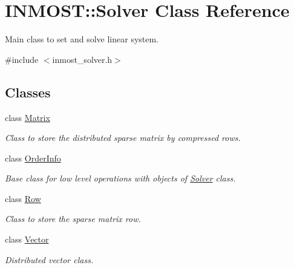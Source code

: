 \hypertarget{classINMOST_1_1Solver}{\section{I\-N\-M\-O\-S\-T\-:\-:Solver Class Reference}
\label{classINMOST_1_1Solver}
}


Main class to set and solve linear system.  




{\ttfamily \#include $<$inmost\-\_\-solver.\-h$>$}

\subsection*{Classes}
\begin{DoxyCompactItemize}
\item 
class \hyperlink{classINMOST_1_1Solver_1_1Matrix}{Matrix}
\begin{DoxyCompactList}\small\item\em Class to store the distributed sparse matrix by compressed rows. \end{DoxyCompactList}\item 
class \hyperlink{classINMOST_1_1Solver_1_1OrderInfo}{Order\-Info}
\begin{DoxyCompactList}\small\item\em Base class for low level operations with objects of \hyperlink{classINMOST_1_1Solver}{Solver} class. \end{DoxyCompactList}\item 
class \hyperlink{classINMOST_1_1Solver_1_1Row}{Row}
\begin{DoxyCompactList}\small\item\em Class to store the sparse matrix row. \end{DoxyCompactList}\item 
class \hyperlink{classINMOST_1_1Solver_1_1Vector}{Vector}
\begin{DoxyCompactList}\small\item\em Distributed vector class. \end{DoxyCompactList}\end{DoxyCompactItemize}
